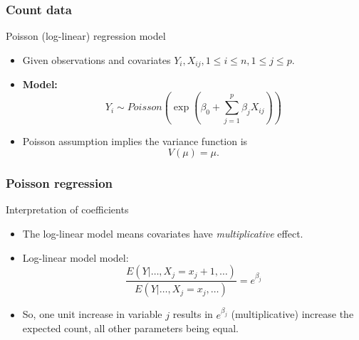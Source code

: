 \documentclass[handout]{beamer}
\begin{document}

   \begin{frame} \frametitle{Count data}

   \begin{block}
       {Poisson (log-linear) regression model}

       \begin{itemize}
       \item      Given observations and covariates
        $Y_i , X_{ij} , 1 \leq i  \leq n, 1 \leq j  \leq p$.


      \item {\bf Model:}
   $$     Y_{i} \sim Poisson \left(\exp\left(\beta_0 + \sum_{j=1}^p \beta_j X_{ij} \right)\right)$$


   \item Poisson assumption implies the  variance
        function is
   $$ V (\mu) = \mu.$$
       \end{itemize}

   \end{block}
   \end{frame}


   \begin{frame} \frametitle{Poisson regression}

   \begin{block}
   {Interpretation of coefficients}

   \begin{itemize}
   \item   The log-linear model
   means covariates have {\em multiplicative} effect.

   \item Log-linear model model:
   $$
   \frac{E(Y|\dots, X_j=x_j+1, \dots)}{E(Y|\dots, X_j=x_j, \dots)} = e^{\beta_j}
   $$


   \item So, one unit increase in variable $j$ results in $e^{\beta_j}$
   (multiplicative) increase the expected count, all other parameters being equal.

   \end{itemize}
   \end{block}
   \end{frame}

\end{document}
